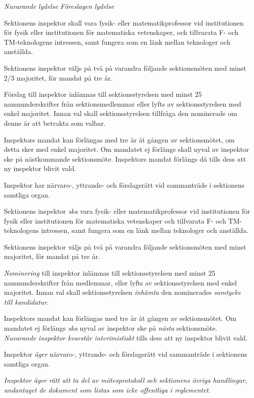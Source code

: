 \documentclass{article}
\newenvironment{lydelse}
    {\begin{paracol}{2}%
        \emph{Nuvarande lydelse}%
        \switchcolumn%
        \emph{Föreslagen lydelse}%
    \end{paracol}%
    \begin{enumerate}[label=\thesubsection.\arabic*]%
    \begin{paracol}{2}%
    }{\end{paracol}\end{enumerate}}
\newcommand{\itemb}{\item[\textbullet]}
\begin{document}
\begin{lydelse}
    \itemb Sektionens inspektor skall vara fysik- eller matematikprofessor vid institutionen för fysik eller institutionen för matematiska vetenskaper, och tillvarata F- och TM-teknologens intressen, samt fungera som en länk mellan teknologer och anställda.
	
	\itemb Sektionens inspektor väljs på två på varandra följande sektionsmöten med minst 2/3 majoritet, för mandat på tre år. 
	
	\itemb Förslag till inspektor inlämnas till sektionsstyrelsen med minst 25 namnunderskrifter från sektionsmedlemmar eller lyfts av sektionsstyrelsen med enkel majoritet. Innan val skall sektionsstyrelsen tillfråga den nominerade om denne är att betrakta som valbar.
	
    \itemb Inspektors mandat kan förlängas med tre år åt gången av sektionsmötet, om detta sker med enkel majoritet. Om mandatet ej förlängs skall nyval av inspektor ske på nästkommande sektionsmöte. Inspektors mandat förlängs då tills dess att ny inspektor blivit vald.

    \itemb Inspektor har närvaro-, yttrande- och förslagsrätt vid sammanträde i sektionens samtliga organ.
    
  \switchcolumn
  \setcounter{enumi}{0}
    
    \item Sektionens inspektor \emph{ska} vara fysik- eller matematikprofessor vid institutionen för fysik eller institutionen för matematiska vetenskaper och tillvarata F- och TM-teknologens intressen, samt fungera som en länk mellan teknologer och anställda.
	
	\item Sektionens inspektor väljs på två på varandra följande sektionsmöten med minst  majoritet, för mandat på tre år. 
	
	\item \emph{Nominering} till inspektor inlämnas till sektionsstyrelsen med minst 25 namnunderskrifter från medlemmar, eller lyfts av sektionsstyrelsen med enkel majoritet.
    Innan val skall sektionsstyrelsen \emph{inhämta} den nominerades \emph{samtycke till kandidatur}.
	
	\item Inspektors mandat kan förlängas med tre år åt gången av sektionsmötet.
    Om mandatet ej förlängs \emph{ska} nyval av inspektor ske på \emph{nästa} sektionsmöte.
	\emph{Nuvarande inspektor kvarstår interimistiskt} tills dess att ny inspektor blivit vald.

    \item Inspektor \emph{äger} närvaro-, yttrande- och förslagsrätt vid sammanträde i sektionens samtliga organ.
    
    \item \emph{Inspektor äger rätt att ta del av mötesprotokoll och sektionens övriga handlingar, undantaget de dokument som listas som icke offentliga i reglementet.}
\end{lydelse}
\end{document}

